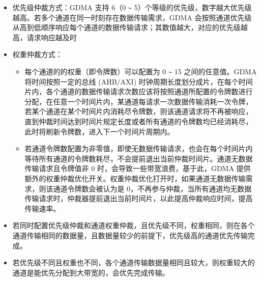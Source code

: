 \documentclass[main\_\_CN.tex]{subfiles}
\begin{document}
\begin{itemize}
\item 优先级仲裁方式：GDMA 支持 6（0 \verb+~+ 5）个等级的优先级，数字越大优先级越高。若多个通道在同一时刻存在数据传输需求，GDMA 会按照通道优先级从高到低顺序响应每个通道的数据传输请求；其数值越大，对应的优先级越高，请求响应越及时
\item 权重仲裁方式：
    \begin{itemize}
        \item 每个通道的的权重（即令牌数）可以配置为 0 \verb+~+ 15 之间的任意值。GDMA 将时间按照一定的总线 (AHB/AXI) 时钟周期长度划分成片，在每个时间片内，各个通道的数据传输请求次数应该将按照通道所配置的令牌数进行分配，在任意一个时间片内，某通道每请求一次数据传输消耗一次令牌，若某个通道在某个时间片内消耗尽令牌数，则该通道请求将不再被响应，直到仲裁时间达到时间片规定长度或者所有通道的令牌数均已经消耗尽，此时将刷新令牌数，进入下一个时间片周期内。
        \item 若通道令牌数配置为非零值，即使无数据传输请求，也会在每个时间片内等待所有通道的令牌数耗尽，不会提前退出当前仲裁时间片。通道无数据传输请求且令牌值非 0 时，会导致一些带宽浪费，基于此，GDMA 提供额外的权重仲裁优化开关。权重仲裁优化打开时，如果通道无数据传输需求，则该通道令牌数会被认为是 0，不再参与仲裁，当所有通道均无数据传输请求时，仲裁器提前退出当前时间片，以此提高仲裁响应时间，提高传输速率。
    \end{itemize}
\end{itemize}

\begin{tiplisting}
\vspace{-2em}
\begin{itemize}
    \item 若同时配置优先级仲裁和通道权重仲裁，且优先级不同，权重相同，则在各个通道传输相同的数据量，且数据量较少的前提下，优先级高的通道优先传输完成。
    \item 若优先级不同且权重也不同，各个通道传输数据量相同且较大，则权重较大的通道是能优先分配到大带宽的，会优先完成传输。
\end{itemize}
\end{tiplisting}
\end{document}
